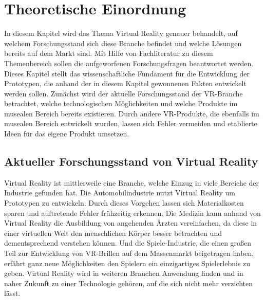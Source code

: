 \documentclass[a4paper,12pt,oneside]{article}
\begin{document}
  \section{Theoretische Einordnung}
    In diesem Kapitel wird das Thema Virtual Reality genauer behandelt, auf welchem
    Forschungsstand sich diese Branche befindet und welche Lösungen bereits auf 
    dem Markt sind. Mit Hilfe von Fachliteratur zu diesem Themenbereich sollen die
    aufgeworfenen Forschungsfragen beantwortet werden. Dieses Kapitel stellt das
    wissenschaftliche Fundament für die Entwicklung der Prototypen, die anhand der in
    diesem Kapitel gewonnenen Fakten entwickelt werden sollen. Zunächst wird der aktuelle
    Forschungsstand der VR-Branche betrachtet, welche technologischen
    Möglichkeiten und welche Produkte im musealen Bereich bereits existieren.
    Durch andere VR-Produkte, die ebenfalls im musealen Bereich entwickelt wurden, lassen
    sich Fehler vermeiden und etablierte Ideen für das eigene Produkt umsetzen.
    \subsection{Aktueller Forschungsstand von Virtual Reality}
      Virtual Reality ist mittlerweile eine Branche, welche Einzug in viele Bereiche der
      Industrie gefunden hat. Die Automobilindustrie nutzt Virtual Reality um Prototypen
      zu entwickeln. Durch dieses Vorgehen lassen sich Materialkosten sparen und auftretende
      Fehler frühzeitig erkennen. Die Medizin kann anhand von Virtual Reality die
      Ausbildung von angehenden Ärzten vereinfachen, da diese in einer virtuellen Welt
      den menschlichen Körper besser betrachten und dementsprechend verstehen können. Und
      die Spiele-Industrie, die einen großen Teil zur Entwicklung von
      VR-Brillen auf dem Massenmarkt beigetragen haben, erfährt ganz neue Möglichkeiten 
      den Spielern ein einzigartiges Spielerlebnis zu geben. Virtual Reality wird 
      in weiteren Branchen Anwendung finden und in naher Zukunft zu
      einer Technologie gehören, auf die sich nicht mehr verzichten lässt.
\end{document}
